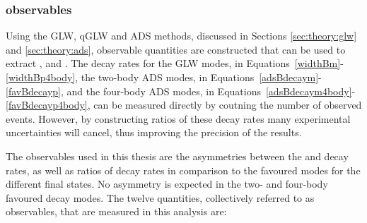 \subsubsection{\CP observables}
\label{sec:theory:observables}

Using the GLW, qGLW and ADS methods, discussed in Sections \ref{sec:theory:glw} and \ref{sec:theory:ads}, observable quantities are constructed that can be used to extract \rb, \deltab and \Pgamma. The decay rates for the GLW modes, in Equations~\ref{widthBm}-\ref{widthBp4body}, the two-body ADS modes, in Equations~\ref{adsBdecaym}-\ref{favBdecayp}, and the four-body ADS modes, in Equations~\ref{adsBdecaym4body}-\ref{favBdecayp4body}, can be measured directly by coutning the number of observed events. However, by constructing ratios of these decay rates many experimental uncertainties will cancel, thus improving the precision of the results. 

The observables used in this thesis are the asymmetries between the \Bm and \Bp decay rates, as well as ratios of decay rates in comparison to the favoured modes for the different \Dz final states. No \CP asymmetry is expected in the two- and four-body favoured \Dz decay modes. The twelve quantities, collectively referred to as \CP observables, that are measured in this analysis are:

